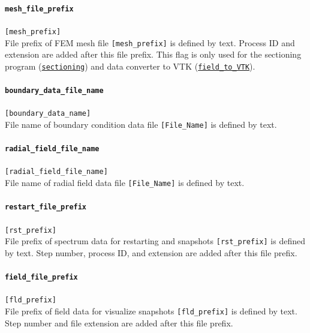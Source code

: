 \paragraph{\tt mesh\_file\_prefix}
\label{href_t:mesh_file_prefix}
\verb|[mesh_prefix]| \\
File prefix of FEM mesh file \verb|[mesh_prefix]| is defined by text. Process ID and extension are added after this file prefix. This flag is only used for the sectioning program (\hyperref[sec:sectioning]{\tt sectioning}) and data converter to VTK (\hyperref[sec:field_to_VTK]{\tt field\_to\_VTK}).

\paragraph{\tt boundary\_data\_file\_name}
\label{href_t:boundary_data_file_name}
\verb|[boundary_data_name]| \\
File name of boundary condition data file \verb|[File_Name]| is defined by text. 

\paragraph{\tt radial\_field\_file\_name}
\label{href_t:radial_field_file_name}
\verb|[radial_field_file_name]| \\
File name of radial field data file \verb|[File_Name]| is defined by text. 

\paragraph{\tt restart\_file\_prefix}
\label{href_t:restart_file_prefix}
\verb|[rst_prefix]| \\
File prefix of spectrum data for restarting and snapshots \verb|[rst_prefix]| is defined by text. Step number, process ID, and extension are added after this file prefix.

\paragraph{\tt field\_file\_prefix}
\label{href_t:field_file_prefix}
\verb|[fld_prefix]| \\
File prefix of field data for visualize snapshots \verb|[fld_prefix]| is defined by text. Step number and file extension are  added after this file prefix.

